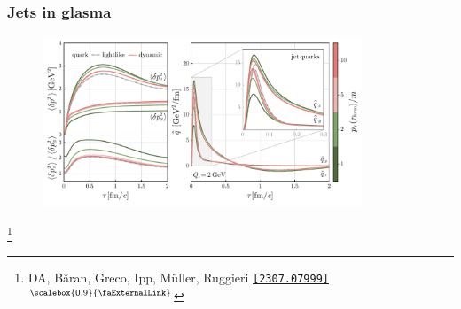 \documentclass[aspectratio=169,11pt,usenames,dvipsnames]{beamer}
\renewcommand{\thefootnote}{\color{customblue}\faPaperPlaneO}
\newcommand\blfootnote[1]{%
  \begingroup
  \renewcommand\thefootnote{}\footnote{#1}%
  \addtocounter{footnote}{-1}%
  \endgroup
}
\begin{document}



\begin{frame}
    \frametitle{Jets in glasma}
    \begin{center}
        \begin{figure}
            \centering
            \includegraphics[width=0.85\textwidth]{images/hp23_mom_broad_qhat_anis_wong_vs_qhat.pdf}
        \end{figure}
    \end{center}
    \vspace{-20pt}
    \blfootnote{\scriptsize DA, Băran, Greco, Ipp, Müller, Ruggieri  \href{https://arxiv.org/abs/2307.07999}{{\color{custompink}\texttt{[2307.07999]}$^\text{\scalebox{0.9}{\faExternalLink}}$}}}
\end{frame}
\end{document}
